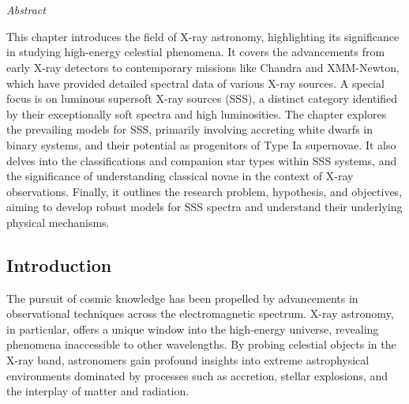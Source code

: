 \chapter{\MakeUppercase{\ChapterTitleOne}} \label{chap:introduction}
    \minitoc
    
    \newpage
    \begin{center}
    	\emph{Abstract}
    \end{center}
    This chapter introduces the field of X-ray astronomy, highlighting its significance in studying high-energy celestial phenomena. It covers the advancements from early X-ray detectors to contemporary missions like Chandra and XMM-Newton, which have provided detailed spectral data of various X-ray sources. A special focus is on luminous supersoft X-ray sources (SSS), a distinct category identified by their exceptionally soft spectra and high luminosities. The chapter explores the prevailing models for SSS, primarily involving accreting white dwarfs in binary systems, and their potential as progenitors of Type Ia supernovae. It also delves into the classifications and companion star types within SSS systems, and the significance of understanding classical novae in the context of X-ray observations. Finally, it outlines the research problem, hypothesis, and objectives, aiming to develop robust models for SSS spectra and understand their underlying physical mechanisms.
    
    \newpage
    \section{Introduction} \label{introduction:introduction}
    	The pursuit of cosmic knowledge has been propelled by advancements in observational techniques across the electromagnetic spectrum.
 X-ray astronomy, in particular, offers a unique window into the high-energy universe, revealing phenomena inaccessible to other wavelengths. By probing celestial objects in the X-ray band, astronomers gain profound insights into extreme astrophysical environments dominated by processes such as accretion, stellar explosions, and the interplay of matter and radiation.
        
